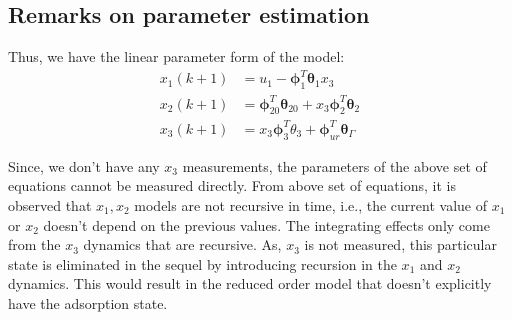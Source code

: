  \subsection{Remarks on parameter estimation}
 Thus, we have the linear parameter form of the model:
 \begin{align*}
     x_1(k+1) &= u_1 - \pmb \phi_1^T  \pmb \theta_1 x_3 \\
     x_2 (k+1) &= \pmb \phi_{20}^T \pmb \theta_{20} + x_3 \pmb \phi_2^T \pmb \theta_2\\
     x_3(k+1) &= x_3 \pmb \phi_3^T \theta_3 + \pmb \phi_{ur}^T \pmb \theta_\Gamma
 \end{align*}

 Since, we don't have any $x_3$ measurements, the parameters of the above set of equations cannot be measured directly. From above set of equations, it is observed that $x_1, x_2$ models are not recursive in time, i.e., the current value of $x_1$ or $x_2$ doesn't depend on the previous values. The integrating effects only come from the $x_3$ dynamics that are recursive. As, $x_3$ is not measured, this particular state is eliminated in the sequel by introducing recursion in the $x_1$ and $x_2$ dynamics. This would result in the reduced order model that doesn't explicitly have the adsorption state.
